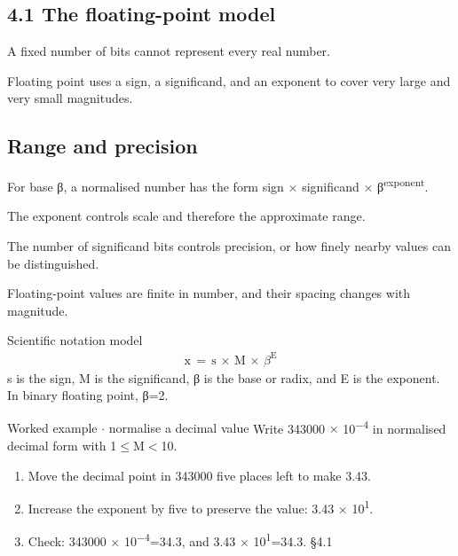 \documentclass[11pt]{article}
\begin{document}
\begin{keepsection}
\section{4.1 The floating-point model}

A fixed number of bits cannot represent every real number.

Floating point uses a sign, a significand, and an exponent to cover very large and very small magnitudes.

\begin{keepsection}
\subsection{Range and precision}

For base β, a normalised number has the form sign \ensuremath{\times} significand \ensuremath{\times} β\textsuperscript{exponent}.

The exponent controls scale and therefore the approximate range.

The number of significand bits controls precision, or how finely nearby values can be distinguished.

Floating-point values are finite in number, and their spacing changes with magnitude.

\begin{equationcard}{Scientific notation model}
\[ \begin{gathered} \mathrm{x}\, =\, \mathrm{s}\, \times \, \mathrm{M}\, \times \, β^{\mathrm{E}} \end{gathered} \]
{\small s is the sign, M is the significand, β is the base or radix, and E is the exponent. In binary floating point, β=2.}
\end{equationcard}

\begin{workedbox}{Worked example \ensuremath{\cdot} normalise a decimal value}
Write 343000 \ensuremath{\times} 10\textsuperscript{\ensuremath{-}4} in normalised decimal form with 1\ensuremath{\leq}M\ensuremath{<}10.

\begin{enumerate}
\item Move the decimal point in 343000 five places left to make 3.43.
\item Increase the exponent by five to preserve the value: 3.43 \ensuremath{\times} 10\textsuperscript{1}.
\item Check: 343000 \ensuremath{\times} 10\textsuperscript{\ensuremath{-}4}=34.3, and 3.43 \ensuremath{\times} 10\textsuperscript{1}=34.3. \hfill{\small\color{FAUblue}§4.1}
\end{enumerate}
\end{workedbox}


\end{keepsection}
\end{keepsection}
\end{document}
